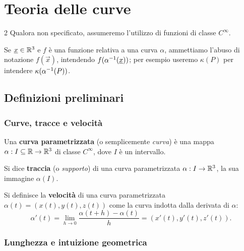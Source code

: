 \chapter{Teoria delle curve}
\setlength{\parindent}{2pt}

\begin{multicols*}{2}
    Qualora non specificato, assumeremo l'utilizzo di funzioni di classe $C^\infty$. \smallskip

    Se ${\underline{x}} \in \mathbb{R}^3$ e $f$ è una funzione relativa a una curva $\alpha$, ammettiamo l'abuso di notazione
    $f(\vec{x})$, intendendo $f(\alpha^{-1}({\underline{x}}))$; per esempio useremo $\kappa(P)$ per intendere $\kappa(\alpha^{-1}(P))$.

    \section{Definizioni preliminari}

    \subsection{Curve, tracce e velocità}

    \begin{definition}
        Una \textbf{curva parametrizzata} (o semplicemente \textit{curva})
        è una mappa $\alpha : I \subseteq \mathbb{R} \to \mathbb{R}^3$
        di classe $C^\infty$, dove $I$ è un intervallo.
    \end{definition}

    \begin{definition}
        Si dice \textbf{traccia} (o \textit{supporto}) di una curva
        parametrizzata $\alpha : I \to \mathbb{R}^3$, la sua immagine $\alpha(I)$.
    \end{definition}

    \begin{definition}
        Si definisce la \textbf{velocità} di una curva parametrizzata
        $\alpha(t) = (x(t), y(t), z(t))$ come la curva indotta dalla derivata di $\alpha$:
        \[ \alpha'(t) = \lim_{h \to 0} \frac{\alpha(t + h) - \alpha(t)}{h} = (x'(t), y'(t), z'(t)). \]
    \end{definition}

    \subsection{Lunghezza e intuizione geometrica}


\end{multicols*}
